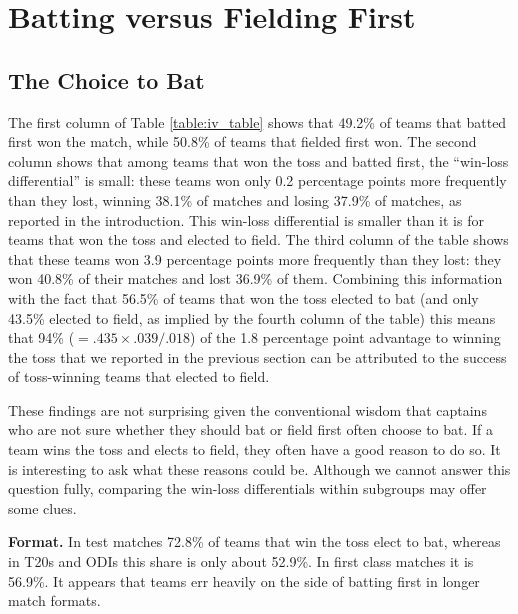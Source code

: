 \documentclass[11pt,  letterpaper]{article}
\begin{document}





\section{Batting versus Fielding First}

\subsection{The Choice to Bat}

The first column of Table \ref{table:iv_table} shows that 49.2\% of teams that batted first won the match, while 50.8\% of teams that fielded first won. The second column shows that among teams that won the toss and batted first, the ``win-loss differential'' is small: these teams won only 0.2 percentage points more frequently than they lost, winning 38.1\% of matches and losing 37.9\% of matches, as reported in the introduction. This win-loss differential is smaller than it is for teams that won the toss and elected to field. The third column of the table shows that these teams won 3.9 percentage points more frequently than they lost: they won 40.8\% of their matches and lost 36.9\% of them. Combining this information with the fact that 56.5\% of teams that won the toss elected to bat (and only 43.5\% elected to field, as implied by the fourth column of the table) this means that 94\% ($= .435 \times .039/.018$) of the 1.8 percentage point advantage to winning the toss that we reported in the previous section can be attributed to the success of toss-winning teams that elected to field. 

These findings are not surprising given the conventional wisdom that captains who are not sure whether they should bat or field first often choose to bat. If a team wins the toss and elects to field, they often have a good reason to do so. It is interesting to ask what these reasons could be. Although we cannot answer this question fully, comparing  the win-loss differentials within subgroups may offer some clues. 

\textbf{Format.} In test matches 72.8\% of teams that win the toss elect to bat, whereas in T20s and ODIs this share is only about 52.9\%. In first class matches it is 56.9\%. It appears that teams err heavily on the side of batting first in longer match formats. 
\end{document}
